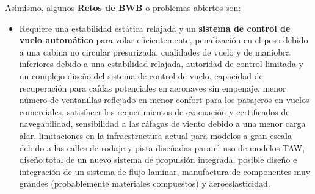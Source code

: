 %
Asimismo, algunos \textbf{Retos de BWB} o problemas abiertos son:
\begin{itemize}
    \item Requiere una estabilidad estática relajada y un \textbf{sistema de control de vuelo automático} para volar eficientemente, penalización en el peso debido a una cabina no circular presurizada, cualidades de vuelo y de maniobra inferiores debido a una estabilidad relajada, autoridad de control limitada y un complejo diseño del sistema de control de vuelo, capacidad de recuperación para caídas potenciales en aeronaves sin empenaje, menor número de ventanillas reflejado en menor confort para los pasajeros en vuelos comerciales, satisfacer los requerimientos de evacuación y certificados de navegabilidad, sensibilidad a las ráfagas de viento debido a una menor carga alar, limitaciones en la infraestructura actual para modelos a gran escala debido a las calles de rodaje y pista diseñadas para el uso de modelos TAW, diseño total de un nuevo sistema de propulsión integrada, posible diseño e integración de un sistema de flujo laminar, manufactura de componentes muy grandes (probablemente materiales compuestos) y aeroeslasticidad.
\end{itemize}

